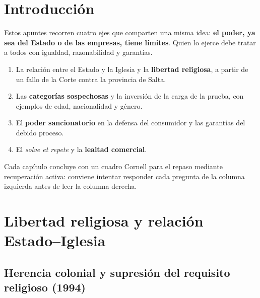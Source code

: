 \documentclass[12pt,oneside]{book}
\begin{document}
\tableofcontents

\chapter*{Introducción}

Estos apuntes recorren cuatro ejes que comparten una misma idea: \textbf{el poder, ya sea del Estado o de las empresas, tiene límites}. Quien lo ejerce debe tratar a todos con igualdad, razonabilidad y garantías.

\begin{enumerate}
    \item La relación entre el Estado y la Iglesia y la \textbf{libertad religiosa}, a partir de un fallo de la Corte contra la provincia de Salta.
    \item Las \textbf{categorías sospechosas} y la inversión de la carga de la prueba, con ejemplos de edad, nacionalidad y género.
    \item El \textbf{poder sancionatorio} en la defensa del consumidor y las garantías del debido proceso.
    \item El \textit{solve et repete} y la \textbf{lealtad comercial}.
\end{enumerate}

Cada capítulo concluye con un cuadro Cornell para el repaso mediante recuperación activa: conviene intentar responder cada pregunta de la columna izquierda antes de leer la columna derecha.

\chapter[Libertad religiosa y Estado--Iglesia]{Libertad religiosa y relación Estado--Iglesia}

\section{Herencia colonial y supresión del requisito religioso (1994)}
\end{document}
